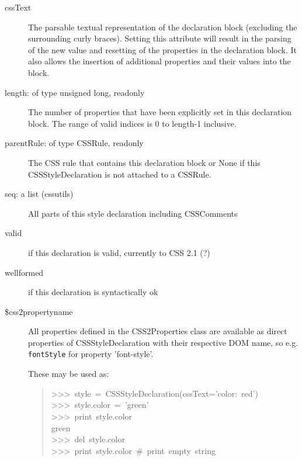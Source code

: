 \begin{description}
\item[{cssText}] \leavevmode 
The parsable textual representation of the declaration block
(excluding the surrounding curly braces). Setting this attribute
will result in the parsing of the new value and resetting of the
properties in the declaration block. It also allows the insertion
of additional properties and their values into the block.

\item[{length: of type unsigned long, readonly}] \leavevmode 
The number of properties that have been explicitly set in this
declaration block. The range of valid indices is 0 to length-1
inclusive.

\item[{parentRule: of type CSSRule, readonly}] \leavevmode 
The CSS rule that contains this declaration block or None if this
CSSStyleDeclaration is not attached to a CSSRule.

\item[{seq: a list (cssutils)}] \leavevmode 
All parts of this style declaration including CSSComments

\item[{valid}] \leavevmode 
if this declaration is valid, currently to CSS 2.1 (?)

\item[{wellformed}] \leavevmode 
if this declaration is syntactically ok

\item[{{\$}css2propertyname}] \leavevmode 
All properties defined in the CSS2Properties class are available
as direct properties of CSSStyleDeclaration with their respective
DOM name, so e.g. \texttt{fontStyle} for property 'font-style'.

These may be used as:
\begin{quote}{\ttfamily \raggedright \noindent
>{}>{}>~style~=~CSSStyleDeclaration(cssText='color:~red')~\\
>{}>{}>~style.color~=~'green'~\\
>{}>{}>~print~style.color~\\
green~\\
>{}>{}>~del~style.color~\\
>{}>{}>~print~style.color~{\#}~print~empty~string
}\end{quote}

\end{description}



